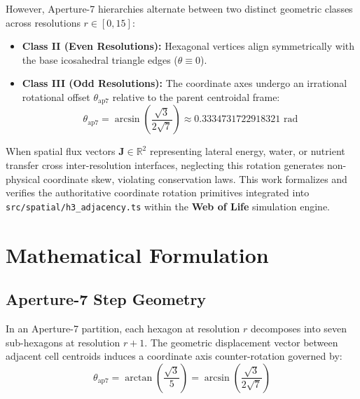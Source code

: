 \documentclass[10pt,journal,compsoc]{IEEEtran}
\begin{document}
However, Aperture-7 hierarchies alternate between two distinct geometric classes across resolutions $r \in [0, 15]$:
\begin{itemize}
    \item \textbf{Class II (Even Resolutions):} Hexagonal vertices align symmetrically with the base icosahedral triangle edges ($\theta \equiv 0$).
    \item \textbf{Class III (Odd Resolutions):} The coordinate axes undergo an irrational rotational offset $\theta_{\text{ap7}}$ relative to the parent centroidal frame:
    \begin{equation}
        \theta_{\text{ap7}} = \arcsin\left(\frac{\sqrt{3}}{2\sqrt{7}}\right) \approx 0.3334731722918321 \text{ rad}
    \end{equation}
\end{itemize}

When spatial flux vectors $\mathbf{J} \in \mathbb{R}^2$ representing lateral energy, water, or nutrient transfer cross inter-resolution interfaces, neglecting this rotation generates non-physical coordinate skew, violating conservation laws. This work formalizes and verifies the authoritative coordinate rotation primitives integrated into \texttt{src/spatial/h3\_adjacency.ts} within the \textbf{Web of Life} simulation engine.

\section{Mathematical Formulation}

\subsection{Aperture-7 Step Geometry}
In an Aperture-7 partition, each hexagon at resolution $r$ decomposes into seven sub-hexagons at resolution $r+1$. The geometric displacement vector between adjacent cell centroids induces a coordinate axis counter-rotation governed by:
\begin{equation}
    \theta_{\text{ap7}} = \arctan\left(\frac{\sqrt{3}}{5}\right) = \arcsin\left(\frac{\sqrt{3}}{2\sqrt{7}}\right)
\end{equation}
\end{document}
